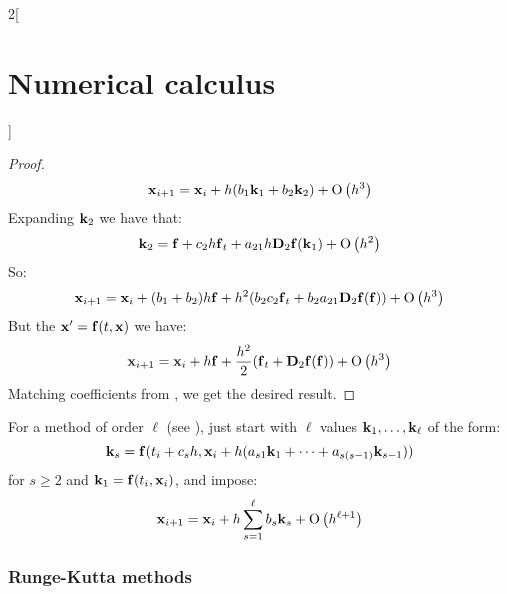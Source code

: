 \documentclass[../../../main_math.tex]{subfiles}
\begin{document}
\begin{multicols}{2}[\section{Numerical calculus}]
\begin{proof}
\begin{gather*}
      \vf{x}_{i+1}=\vf{x}_i+h(b_1\vf{k}_1+b_2\vf{k}_2)+\O{h^3}
    \end{gather*}
    Expanding $\vf{k}_2$ we have that:
    $$\vf{k}_2=\vf{f}+c_2h\vf{f}_t+a_{21}h\vf{D}_2\vf{f}(\vf{k}_1)+\O{h^2}$$
    So:
    \begin{equation}\label{NC:heun1}
      \vf{x}_{i+1}=\vf{x}_i+(b_1+b_2)h\vf{f}+h^2(b_2c_2\vf{f}_t+b_2a_{21}\vf{D}_2\vf{f}(\vf{f}))+\O{h^3}
    \end{equation}
    But the $\vf{x}'=\vf{f}(t,\vf{x})$ we have:
    \begin{equation}\label{NC:heun2}
      \vf{x}_{i+1}=\vf{x}_i+h\vf{f}+\frac{h^2}{2}(\vf{f}_t+\vf{D}_2\vf{f}(\vf{f}))+\O{h^3}
    \end{equation}
    Matching coefficients from , we get the desired result.
  \end{proof}
  \begin{remark}
    For a method of order $\ell$ (see ), just start with $\ell$ values $\vf{k}_1,\ldots,\vf{k}_\ell$ of the form: $$\vf{k}_s=\vf{f}(t_i+c_sh,\vf{x}_i+h(a_{s1}\vf{k}_1+\cdots+a_{s(s-1)}\vf{k}_{s-1}))$$
    for $s\geq 2$ and $\vf{k}_1=\vf{f}(t_i,\vf{x}_i)$, and impose:
    $$\vf{x}_{i+1}=\vf{x}_i+h\sum_{s=1}^\ell b_s\vf{k}_s+\O{h^{\ell+1}}$$
  \end{remark}
  \subsubsection{Runge-Kutta methods}\label{NC:rungekutta}
\end{multicols}
\end{document}
